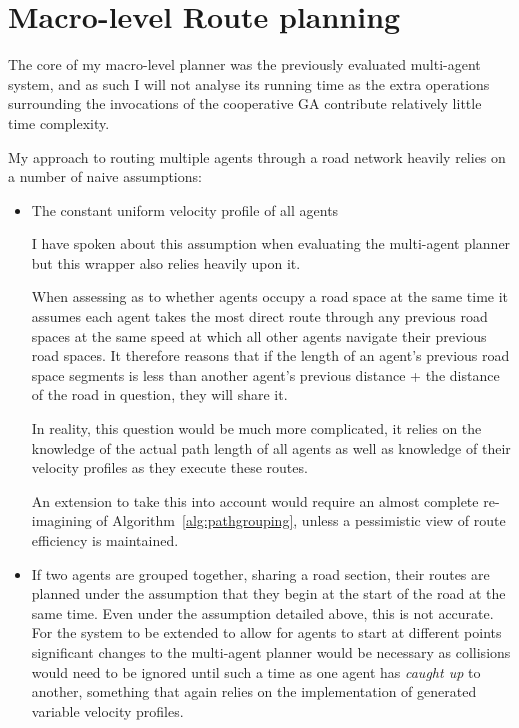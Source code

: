 \section{Macro-level Route planning}

The core of my macro-level planner was the previously evaluated multi-agent system, and as such I will not analyse its running time as the extra operations surrounding the invocations of the cooperative GA contribute relatively little time complexity.

My approach to routing multiple agents through a road network heavily relies on a number of naive assumptions:

\begin{itemize}
  \item The constant uniform velocity profile of all agents

        I have spoken about this assumption when evaluating the multi-agent planner but this wrapper also relies heavily upon it.

        When assessing as to whether agents occupy a road space at the same time it assumes each agent takes the most direct route through any previous road spaces at the same speed at which all other agents navigate their previous road spaces. It therefore reasons that if the length of an agent's previous road space segments is less than another agent's previous distance + the distance of the road in question, they will share it.

        In reality, this question would be much more complicated, it relies on the knowledge of the actual path length of all agents as well as knowledge of their velocity profiles as they execute these routes.

        An extension to take this into account would require an almost complete re-imagining of Algorithm~\ref{alg:pathgrouping}, unless a pessimistic view of route efficiency is maintained.


  \item If two agents are grouped together, sharing a road section, their routes are planned under the assumption that they begin at the start of the road at the same time. Even under the assumption detailed above, this is not accurate. For the system to be extended to allow for agents to start at different points significant changes to the multi-agent planner would be necessary as collisions would need to be ignored until such a time as one agent has \textit{caught up} to another, something that again relies on the implementation of generated variable velocity profiles.


\end{itemize}
